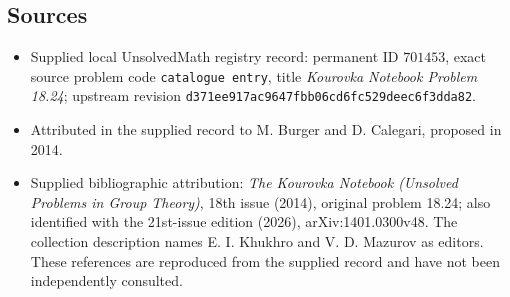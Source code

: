 \documentclass[11pt]{article}
\begin{document}
\subsection{Sources}
\begin{itemize}
\item Supplied local UnsolvedMath registry record: permanent ID \(701453\), exact source problem code \texttt{catalogue entry}, title \emph{Kourovka Notebook Problem 18.24}; upstream revision \texttt{d371ee917ac9647fbb06cd6fc529deec6f3dda82}.
\item Attributed in the supplied record to M. Burger and D. Calegari, proposed in 2014.
\item Supplied bibliographic attribution: \emph{The Kourovka Notebook (Unsolved Problems in Group Theory)}, 18th issue (2014), original problem 18.24; also identified with the 21st-issue edition (2026), arXiv:1401.0300v48. The collection description names E. I. Khukhro and V. D. Mazurov as editors. These references are reproduced from the supplied record and have not been independently consulted.
\end{itemize}
\end{document}
